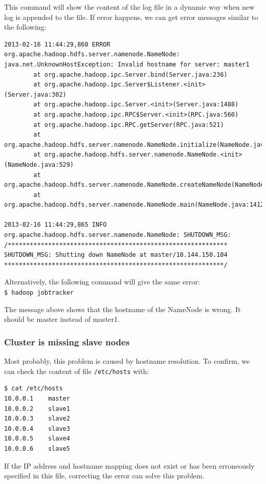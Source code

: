 This command will show the content of the log file in a dynamic way when new log is appended to the file. If error happens, we can get error messages similar to the following:
\lstset{style=bashstyle}
\begin{lstlisting}[caption=Snippet of the NameNode log on the master node.]
2013-02-16 11:44:29,860 ERROR org.apache.hadoop.hdfs.server.namenode.NameNode: java.net.UnknownHostException: Invalid hostname for server: master1
        at org.apache.hadoop.ipc.Server.bind(Server.java:236)
        at org.apache.hadoop.ipc.Server$Listener.<init>(Server.java:302)
        at org.apache.hadoop.ipc.Server.<init>(Server.java:1488)
        at org.apache.hadoop.ipc.RPC$Server.<init>(RPC.java:560)
        at org.apache.hadoop.ipc.RPC.getServer(RPC.java:521)
        at org.apache.hadoop.hdfs.server.namenode.NameNode.initialize(NameNode.java:295)
        at org.apache.hadoop.hdfs.server.namenode.NameNode.<init>(NameNode.java:529)
        at org.apache.hadoop.hdfs.server.namenode.NameNode.createNameNode(NameNode.java:1403)
        at org.apache.hadoop.hdfs.server.namenode.NameNode.main(NameNode.java:1412)

2013-02-16 11:44:29,865 INFO org.apache.hadoop.hdfs.server.namenode.NameNode: SHUTDOWN_MSG:
/************************************************************
SHUTDOWN_MSG: Shutting down NameNode at master/10.144.150.104
************************************************************/
\end{lstlisting}

Alternatively, the following command will give the same error: \\
\verb|$ hadoop jobtracker|

The message above shows that the hostname of the NameNode is wrong. It should be master instead of master1.

\subsubsection*{Cluster is missing slave nodes}
Most probably, this problem is caused by hostname resolution. To confirm, we can check the content of file \verb|/etc/hosts| with:
\lstset{style=bashstyle}
\begin{lstlisting}
$ cat /etc/hosts
10.0.0.1	master
10.0.0.2	slave1
10.0.0.3	slave2
10.0.0.4	slave3
10.0.0.5	slave4
10.0.0.6	slave5
\end{lstlisting}

If the IP address and hostname mapping does not exist or has been erroneously specified in this file, correcting the error can solve this problem.
